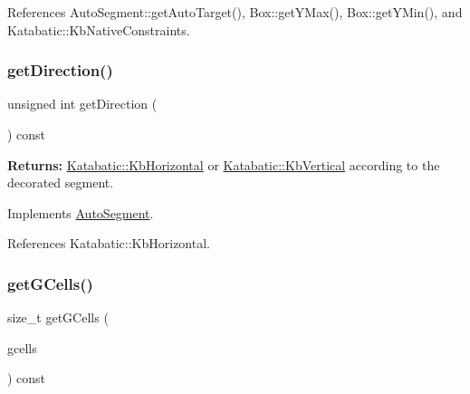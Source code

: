 References Auto\+Segment\+::get\+Auto\+Target(), Box\+::get\+Y\+Max(), Box\+::get\+Y\+Min(), and Katabatic\+::\+Kb\+Native\+Constraints.

\mbox{\label{classKatabatic_1_1AutoHorizontal_a0dd7cf705ace42c662c289955313b2e9}} 
\subsubsection{\texorpdfstring{get\+Direction()}{getDirection()}}
{\footnotesize\ttfamily unsigned int get\+Direction (\begin{DoxyParamCaption}{ }\end{DoxyParamCaption}) const\hspace{0.3cm}{\ttfamily [virtual]}}

{\bfseries Returns\+:} \mbox{\hyperlink{namespaceKatabatic_a2af2ad6b6441614038caf59d04b3b217a1a9045673c5d3c30b067100f1440ae1b}{Katabatic\+::\+Kb\+Horizontal}} or \mbox{\hyperlink{namespaceKatabatic_a2af2ad6b6441614038caf59d04b3b217a284cad95203a27172838b09e396e3590}{Katabatic\+::\+Kb\+Vertical}} according to the decorated segment. 

Implements \mbox{\hyperlink{classKatabatic_1_1AutoSegment_ae35b78590ed6aa546b626ef95f28c533}{Auto\+Segment}}.



References Katabatic\+::\+Kb\+Horizontal.

\mbox{\label{classKatabatic_1_1AutoHorizontal_accdaef4410043f64da247a94a309733e}} 
\subsubsection{\texorpdfstring{get\+G\+Cells()}{getGCells()}}
{\footnotesize\ttfamily size\+\_\+t get\+G\+Cells (\begin{DoxyParamCaption}\item[{vector$<$ \mbox{\hyperlink{classKatabatic_1_1GCell}{G\+Cell}} $\ast$$>$ \&}]{gcells }\end{DoxyParamCaption}) const\hspace{0.3cm}{\ttfamily [virtual]}}



